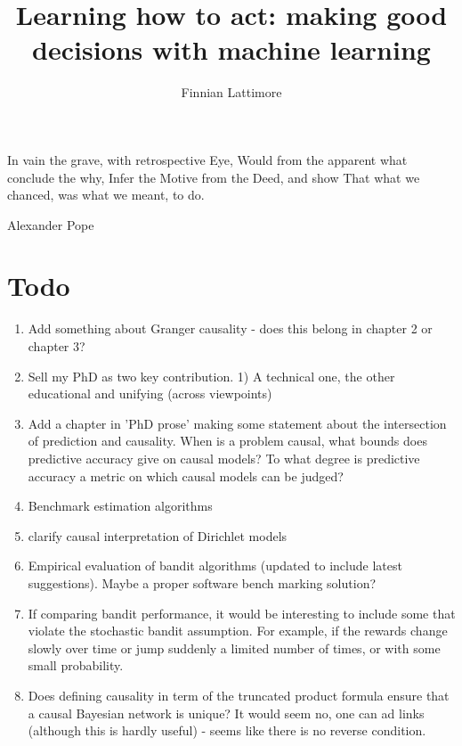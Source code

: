 \documentclass[11pt,a4paper,oneside]{book}
\author{Finnian Lattimore}
\title{Learning how to act: making good decisions with machine learning}
\theoremstyle{plain}
\theoremstyle{definition}
\newcommand{\ci}{\mathrel{\perp\mspace{-10mu}\perp}}
\begin{document}


\maketitle

\epigraph{In vain the grave, with retrospective Eye,
Would from the apparent what conclude the why,
Infer the Motive from the Deed, and show
That what we chanced, was what we meant, to do.}{Alexander Pope}

\tableofcontents

\chapter*{Todo}
\begin{enumerate}
\item Add something about Granger causality - does this belong in chapter 2 or chapter 3?
\item Sell my PhD as two key contribution. 1) A technical one, the other educational and unifying (across viewpoints)
\item Add a chapter in 'PhD prose' making some statement about the intersection of prediction and causality. When is a problem causal, what bounds does predictive accuracy give on causal models? To what degree is predictive accuracy a metric on which causal models can be judged? 
\item Benchmark estimation algorithms
\item clarify causal interpretation of Dirichlet models
\item Empirical evaluation of bandit algorithms (updated to include latest suggestions). Maybe a proper software bench marking solution?
\item If comparing bandit performance, it would be interesting to include some that violate the stochastic bandit assumption. For example, if the rewards change slowly over time or jump suddenly a limited number of times, or with some small probability. 
\item Does defining causality in term of the truncated product formula ensure that a causal Bayesian network is unique? It would seem no, one can ad links (although this is hardly useful) - seems like there is no reverse condition. 
\end{enumerate}
\end{document}
